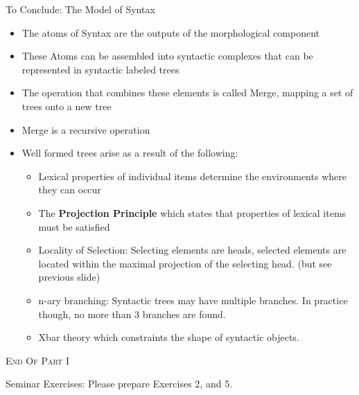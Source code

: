 \begin{frame}
  {To Conclude:  The Model of Syntax}
  \begin{itemize}
  \item The atoms of Syntax are the outputs of the morphological component
  \item These Atoms can be assembled into syntactic complexes that can be represented in syntactic labeled trees
  \item The operation that combines these elements is called Merge, mapping a set of trees onto a new tree
  \item Merge is a recursive operation
  \item Well formed trees arise as a result of the following:
    \begin{itemize}
    \item Lexical properties of individual items determine the environments where they can occur
    \item The \textbf{Projection Principle} which states that properties of lexical items must be satisfied
    \item Locality of Selection:  Selecting elements are heads, selected elements are located within the maximal projection of the selecting head. (but see previous slide)
    \item n-ary branching:  Syntactic trees may have multiple branches.  In practice though, no more than 3 branches are found.
    \item Xbar theory which constraints the shape of syntactic objects. 
    \end{itemize}
  \end{itemize}

\end{frame}

\begin{frame}
  \begin{center}
    E\textsc{nd} O\textsc{f} P\textsc{art} I
  \end{center}
\end{frame}



Seminar Exercises:  Please prepare Exercises 2, and 5. 



